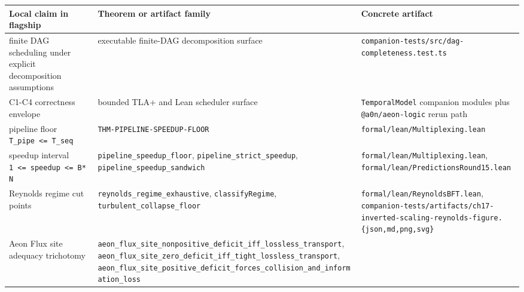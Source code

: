\documentclass[
  11pt,
]{article}
\newcounter{none} %
\begin{document}
{\def\LTcaptype{none} %
\begin{longtable}[]{@{}
  >{\raggedright\arraybackslash}p{}
  >{\raggedright\arraybackslash}p{}
  >{\raggedright\arraybackslash}p{}@{}}
\toprule\noalign{}
\begin{minipage}[b]{\linewidth}\raggedright
Local claim in flagship
\end{minipage} & \begin{minipage}[b]{\linewidth}\raggedright
Theorem or artifact family
\end{minipage} & \begin{minipage}[b]{\linewidth}\raggedright
Concrete artifact
\end{minipage} \\
\midrule\noalign{}
\endhead
\bottomrule\noalign{}
\endlastfoot
finite DAG scheduling under explicit decomposition assumptions &
executable finite-DAG decomposition surface &
\texttt{companion-\allowbreak{}tests/\allowbreak{}src/\allowbreak{}dag-\allowbreak{}completeness.\allowbreak{}test.\allowbreak{}ts} \\
C1-C4 correctness envelope & bounded TLA+ and Lean scheduler surface &
\texttt{TemporalModel} companion modules plus \texttt{@a0n/aeon-logic}
rerun path \\
pipeline floor \texttt{T\_pipe\ \textless{}=\ T\_seq} &
\texttt{THM-PIPELINE-SPEEDUP-FLOOR} &
\texttt{formal/lean/Multiplexing.lean} \\
speedup interval \texttt{1\ \textless{}=\ speedup\ \textless{}=\ B*N} &
\texttt{pipeline\_speedup\_floor}, \texttt{pipeline\_strict\_speedup},
\texttt{pipeline\_speedup\_sandwich} &
\texttt{formal/lean/Multiplexing.lean},
\texttt{formal/lean/PredictionsRound15.lean} \\
Reynolds regime cut points & \texttt{reynolds\_regime\_exhaustive},
\texttt{classifyRegime}, \texttt{turbulent\_collapse\_floor} &
\texttt{formal/lean/ReynoldsBFT.lean},
\texttt{companion-\allowbreak{}tests/\allowbreak{}artifacts/\allowbreak{}ch17-\allowbreak{}inverted-\allowbreak{}scaling-\allowbreak{}reynolds-\allowbreak{}figure.\allowbreak{}\{json,md,png,svg\}} \\
Aeon Flux site adequacy trichotomy &
\texttt{aeon\_flux\_site\_nonpositive\_deficit\_iff\_lossless\_transport},
\texttt{aeon\_flux\_site\_zero\_deficit\_iff\_tight\_lossless\_transport},
\texttt{aeon\_flux\_site\_positive\_deficit\_forces\_collision\_and\_information\_loss}

\end{longtable}}
\end{document}
